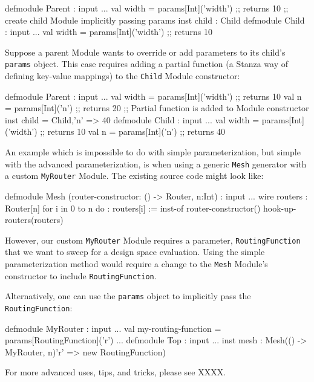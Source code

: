 \begin{stanza}
defmodule Parent :
  input ...
  val width = params[Int]('width') ;; returns 10
  ;; create child Module implicitly passing params
  inst child : Child
defmodule Child :
  input ...
  val width = params[Int]('width') ;; returns 10
\end{stanza}

Suppose a parent Module wants to override or add parameters to its child's \verb+params+ object. This case requires adding a partial function (a Stanza way of defining key-value mappings) to the \verb+Child+ Module constructor:

\begin{stanza}
defmodule Parent :
  input ...
  val width = params[Int]('width') ;; returns 10
  val n = params[Int]('n') ;; returns 20
  ;; Partial function is added to Module constructor
  inst child = Child,{'n' => 40}
defmodule Child :
  input ...
  val width = params[Int]('width') ;; returns 10
  val n = params[Int]('n') ;; returns 40
\end{stanza}

An example which is impossible to do with simple parameterization, but simple with the advanced parameterization, is when using a generic \verb+Mesh+ generator with a custom \verb+MyRouter+ Module. The existing source code might look like:

\begin{stanza}
defmodule Mesh (router-constructor: () -> Router, n:Int) :
  input ...
  wire routers : Router[n]
  for i in 0 to n do :
    routers[i] := inst-of router-constructor()
  hook-up-routers(routers)
\end{stanza}

However, our custom \verb+MyRouter+ Module requires a parameter, \verb+RoutingFunction+ that we want to sweep for a design space evaluation. Using the simple parameterization method would require a change to the \verb+Mesh+ Module's constructor to include \verb+RoutingFunction+. 

Alternatively, one can use the \verb+params+ object to implicitly pass the \verb+RoutingFunction+:

\begin{stanza}
defmodule MyRouter :
  input ...
  val my-routing-function = params[RoutingFunction]('r')
  ...
defmodule Top :
  input ...
  inst mesh : Mesh(() -> MyRouter, n){'r' => new RoutingFunction})
\end{stanza}

For more advanced uses, tips, and tricks, please see XXXX.

